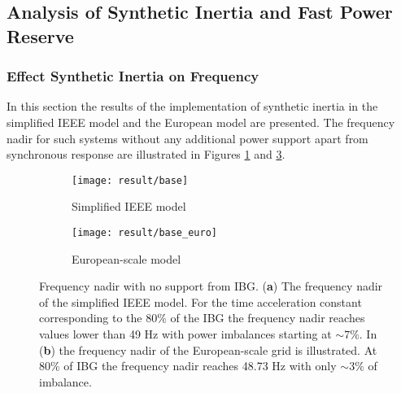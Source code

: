 \subsection{Analysis of Synthetic Inertia and Fast Power Reserve}




\subsubsection{Effect Synthetic Inertia on Frequency}
\label{sec:res_si}
In this section the results of the implementation of synthetic inertia in the simplified IEEE model and the European model are presented. The frequency nadir for such systems without any additional power support apart from synchronous response are illustrated in Figures \ref{fig:res_nadirieee_simp} and \ref{fig:res_nadireuro}.\\

\begin{figure}[h]
	\centering
	\begin{subfigure}[h]{0.49\textwidth}
		\centering
		\texttt{[image: result/base]}
		\caption{Simplified IEEE model}
		\label{fig:res_nadirieee_simp}
	\end{subfigure}
	\hfill
	\begin{subfigure}[h]{0.49\textwidth}
		\centering
		\texttt{[image: result/base\_euro]}
		\caption{European-scale model}
		\label{fig:res_nadireuro}
	\end{subfigure}
	
	
	\caption{Frequency nadir with no support from IBG. (\textbf{a}) The frequency nadir of the simplified IEEE model. For the time acceleration constant corresponding to the 80\% of the IBG the frequency nadir reaches values lower than 49 Hz with power imbalances starting at $ \sim 7\% $. In (\textbf{b}) the frequency nadir of the European-scale grid is illustrated. At 80\% of IBG the frequency nadir reaches 48.73 Hz with only $\sim 3\% $ of imbalance.}
\end{figure}

